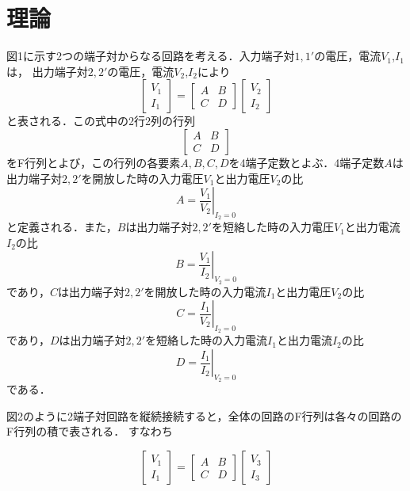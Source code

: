
\section{理論}
図1に示す2つの端子対からなる回路を考える．入力端子対$1,1'$の電圧，電流$V_1$,$I_1$は，
出力端子対$2,2'$の電圧，電流$V_2$,$I_2$により
$$
\left[\begin{array}{c}
V_1 \\
I_1
\end{array}\right]=\left[\begin{array}{ll}
A & B \\
C & D
\end{array}\right]\left[\begin{array}{c}
V_2 \\
I_2
\end{array}\right]
$$
と表される．この式中の2行2列の行列
$$
\left[\begin{array}{ll}A & B \\ C & D\end{array}\right]
$$
をF行列とよび，この行列の各要素$A,B,C,D$を4端子定数とよぶ．4端子定数$A$は出力端子対$2,2'$を開放した時の入力電圧$V_1$と出力電圧$V_2$の比
$$
A=\left.\frac{V_1}{V_2}\right|_{I_2=0}
$$
と定義される．また，$B$は出力端子対$2,2'$を短絡した時の入力電圧$V_1$と出力電流$I_2$の比
$$
B=\left.\frac{V_1}{I_2}\right|_{V_2=0}
$$
であり，$C$は出力端子対$2,2'$を開放した時の入力電流$I_1$と出力電圧$V_2$の比
$$
C=\left.\frac{I_1}{V_2}\right|_{I_2=0}
$$
であり，$D$は出力端子対$2,2'$を短絡した時の入力電流$I_1$と出力電流$I_2$の比
$$
D=\left.\frac{I_1}{I_2}\right|_{V_2=0}
$$
である．


図2のように2端子対回路を縦続接続すると，全体の回路のF行列は各々の回路のF行列の積で表される．
すなわち

$$
\left[\begin{array}{l}
V_1 \\
I_1
\end{array}\right]=\left[\begin{array}{ll}
A & B \\
C & D
\end{array}\right]\left[\begin{array}{c}
V_3 \\
I_3
\end{array}\right]
$$

